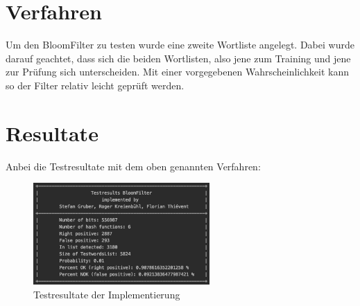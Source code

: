 \documentclass[12pt,a4paper]{report}
\begin{document}
\section{Verfahren}\label{sec:verfahren}
Um den BloomFilter zu testen wurde eine zweite Wortliste angelegt. Dabei wurde darauf geachtet, dass sich die beiden Wortlisten, also jene zum Training und jene zur Prüfung sich unterscheiden. Mit einer vorgegebenen Wahrscheinlichkeit kann so der Filter relativ leicht geprüft werden.
\section{Resultate}\label{sec:resultate}
Anbei die Testresultate mit dem oben genannten Verfahren:
\par\vspace{0.5cm}

 \begin{figure}[h!]
  \centering
  \includegraphics[width=0.6\textwidth]{assets/testresults.png}
  \caption{Testresultate der Implementierung}
  \label{fig:testresults-of-implementation}
\end{figure}
\end{document}
